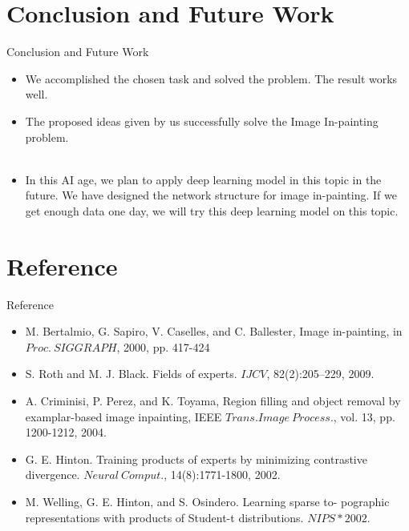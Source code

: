 \documentclass{beamer}
\begin{document}
\section{Conclusion and Future Work}
\begin{frame}{Conclusion and Future Work}
	\begin{itemize}[<+->]
		\item We accomplished the chosen task and solved the problem. The result works well.
		\item The proposed ideas given by us successfully solve the Image In-painting problem.\\\ \\
		\item In this AI age, we plan to apply deep learning model in this topic in the future. We have designed the network structure for image in-painting. If we get enough data one day, we will try this deep learning model on this topic.
	\end{itemize}
\end{frame}

\section*{Reference}
\begin{frame}{Reference}
	\begin{itemize}
		\item M. Bertalmio, G. Sapiro, V. Caselles, and C. Ballester, Image in-painting, in $Proc.\ SIGGRAPH$, 2000, pp. 417-424
		\item S. Roth and M. J. Black. Fields of experts. $IJCV$, 82(2):205–229,
		2009.
		\item A. Criminisi, P. Perez, and K. Toyama, Region filling and object
		removal by examplar-based image inpainting, IEEE $Trans. Image\ 
		Process.$, vol. 13, pp. 1200-1212, 2004.
		\item G. E. Hinton. Training products of experts by minimizing contrastive
		divergence. $Neural\ Comput.$, 14(8):1771-1800, 2002.
		\item M. Welling, G. E. Hinton, and S. Osindero. Learning sparse to-
		pographic representations with products of Student-t distributions.
		$NIPS*2002$.
	\end{itemize}
\end{frame}

\end{document}
